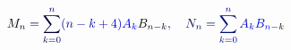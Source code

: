 \documentclass[12pt]{article}
\begin{document}
\makeatletter
\renewcommand*{\@textcolor}[3]{%
  \protect\leavevmode
  \begingroup
    \color#1{#2}#3%
  \endgroup
}
\makeatother
\begin{displaymath}
\mathcolor[RGB]{0,0,15}{M} _ { \mathcolor[RGB]{0,0,30}{n} } \mathcolor[RGB]{0,0,45}{=} \mathcolor[RGB]{0,0,60}{\sum} _ { \mathcolor[RGB]{0,0,75}{k} \mathcolor[RGB]{0,0,90}{=} \mathcolor[RGB]{0,0,105}{0} } ^ { \mathcolor[RGB]{0,0,120}{n} } \mathcolor[RGB]{0,0,135}{(} \mathcolor[RGB]{0,0,150}{n} \mathcolor[RGB]{0,0,165}{-} \mathcolor[RGB]{0,0,180}{k} \mathcolor[RGB]{0,0,195}{+} \mathcolor[RGB]{0,0,210}{4} \mathcolor[RGB]{0,0,225}{)} \mathcolor[RGB]{0,0,240}{A} _ { \mathcolor[RGB]{0,0,255}{k} } \mathcolor[RGB]{0,15,0}{B} _ { \mathcolor[RGB]{0,15,15}{n} \mathcolor[RGB]{0,15,30}{-} \mathcolor[RGB]{0,15,45}{k} } \mathcolor[RGB]{0,15,60}{,} \mathcolor[RGB]{0,15,75}{\quad
N} _ { \mathcolor[RGB]{0,15,90}{n} } \mathcolor[RGB]{0,15,105}{=} \mathcolor[RGB]{0,15,120}{\sum} _ { \mathcolor[RGB]{0,15,135}{k} \mathcolor[RGB]{0,15,150}{=} \mathcolor[RGB]{0,15,165}{0} } ^ { \mathcolor[RGB]{0,15,180}{n} } \mathcolor[RGB]{0,15,195}{A} _ { \mathcolor[RGB]{0,15,210}{k} } \mathcolor[RGB]{0,15,225}{B} _ { \mathcolor[RGB]{0,15,240}{n} \mathcolor[RGB]{0,15,255}{-} \mathcolor[RGB]{0,30,0}{k} }
\end{displaymath}
\end{document}
